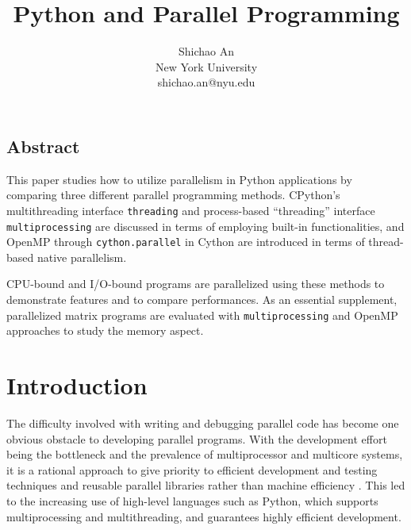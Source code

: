 \documentclass[letterpaper,twocolumn,10pt]{article}
\begin{document}
\fontsize{9pt}{11pt}\selectfont
\hyphenation{}
\date{}

\title{\LARGE \bf Python and Parallel Programming}

\author{
\rm{Shichao An}\\
\rm \small New York University\\
\rm \small {shichao.an@nyu.edu}
}

\maketitle



\subsection*{Abstract}
This paper studies how to utilize parallelism in Python applications by comparing three different parallel programming methods. CPython's multithreading interface \verb#threading# and process-based ``threading'' interface \verb#multiprocessing# are discussed in terms of employing built-in functionalities, and OpenMP through \verb#cython.parallel# in Cython are introduced in terms of thread-based native parallelism.

CPU-bound and I/O-bound programs are parallelized using these methods to demonstrate features and to compare performances. As an essential supplement, parallelized matrix programs are evaluated with \verb#multiprocessing# and OpenMP approaches to study the memory aspect.

\section{Introduction}
The difficulty involved with writing and debugging parallel code has become one obvious obstacle to developing parallel programs. With the development effort being the bottleneck and the prevalence of multiprocessor and multicore systems, it is a rational approach to give priority to efficient development and testing techniques and reusable parallel libraries rather than machine efficiency \cite{hinsen}. This led to the increasing use of high-level languages such as Python, which supports multiprocessing and multithreading, and guarantees highly efficient development.
\end{document}

